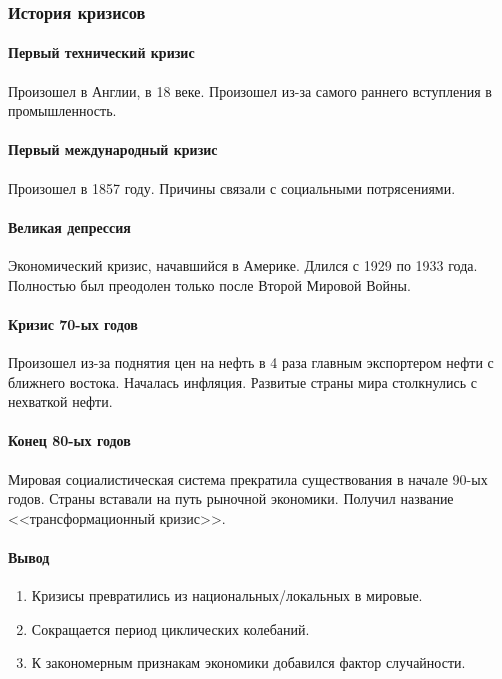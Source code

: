 \documentclass[12pt]{article}
\begin{document}
	\subsubsection{История кризисов}
	
	\paragraph{Первый технический кризис}
	
	Произошел в Англии, в 18 веке. Произошел из-за самого раннего вступления в промышленность.
	
	\paragraph{Первый международный кризис}
	
	Произошел в 1857 году. Причины связали с социальными потрясениями.
	
	\paragraph{Великая депрессия}
	
	Экономический кризис, начавшийся в Америке. Длился с 1929 по 1933 года. Полностью был преодолен только после Второй Мировой Войны.
	
	\paragraph{Кризис 70-ых годов}
	
	Произошел из-за поднятия цен на нефть в 4 раза главным экспортером нефти с ближнего востока. Началась инфляция. Развитые страны мира столкнулись с нехваткой нефти.
	
	\paragraph{Конец 80-ых годов}
	
	Мировая социалистическая система прекратила существования в начале 90-ых годов. Страны вставали на путь рыночной экономики. Получил название <<трансформационный кризис>>.
	
	\paragraph{Вывод}
	
	
	\begin{enumerate}
		\item Кризисы превратились из национальных/локальных в мировые.
		\item Сокращается период циклических колебаний.
		\item К закономерным признакам экономики добавился фактор случайности.
	\end{enumerate}
	
\end{document}
